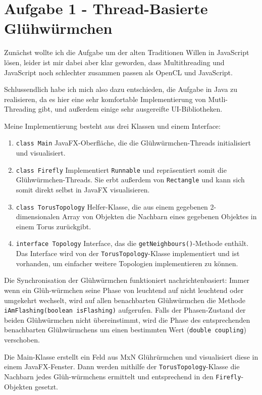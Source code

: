 \documentclass[12pt]{article}
\date{}
\begin{document}
	
\section*{Aufgabe 1 - Thread-Basierte Glühwürmchen}
Zunächst wollte ich die Aufgabe um der alten Traditionen Willen in JavaScript lösen, leider ist mir dabei aber klar geworden, dass Multithreading und JavaScript noch schlechter zusammen passen als OpenCL und JavaScript.

Schlussendlich habe ich mich also dazu entschieden, die Aufgabe in Java zu realisieren, da es hier eine sehr komfortable Implementierung von Mutli-Threading gibt, und außerdem einige sehr ausgereifte UI-Bibliotheken.

Meine Implementierung besteht aus drei Klassen und einem Interface:
\begin{enumerate}
	\item \texttt{class Main} JavaFX-Oberfläche, die die Glühwürmchen-Threads initialisiert und visualisiert.
	\item \texttt{class Firefly} Implementiert \texttt{Runnable} und repräsentiert somit die Glühwürmchen-Threads. Sie erbt außerdem von \texttt{Rectangle} und kann sich somit direkt selbst in JavaFX visualisieren.
	\item \texttt{class TorusTopology} Helfer-Klasse, die aus einem gegebenen 2-dimensionalen Array von Objekten die Nachbarn eines gegebenen Objektes in einem Torus zurückgibt.
	\item \texttt{interface Topology} Interface, das die \texttt{getNeighbours()}-Methode enthält. Das Interface wird von der \texttt{TorusTopology}-Klasse implementiert und ist vorhanden, um einfacher weitere Topologien implementieren zu können.
\end{enumerate}

Die Synchronisation der Glühwürmchen funktioniert nachrichtenbasiert: Immer wenn ein Glüh-würmchen seine Phase von leuchtend auf nicht leuchtend oder umgekehrt wechselt, wird auf allen benachbarten Glühwürmchen die Methode \texttt{iAmFlashing(boolean isFlashing)} aufgerufen. Falls der Phasen-Zustand der beiden Glühwürmchen nicht übereinstimmt, wird die Phase des entsprechenden benachbarten Glühwürmchens um einen bestimmten Wert (\texttt{double coupling}) verschoben.

Die Main-Klasse erstellt ein Feld aus MxN Glührürmchen und visualisiert diese in einem JavaFX-Fenster. Dann werden mithilfe der \texttt{TorusTopology}-Klasse die Nachbarn jedes Glüh-würmchens ermittelt und entsprechend in den \texttt{Firefly}-Objekten gesetzt.
\end{document}
